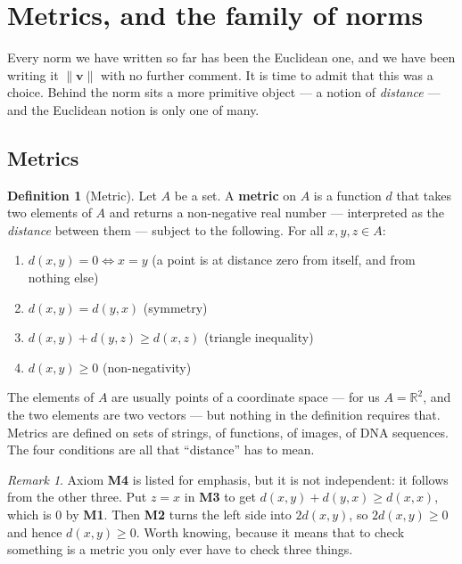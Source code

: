 \documentclass[11pt]{article}
\theoremstyle{definition}
\newtheorem{defn}{Definition}[section]
\theoremstyle{remark}
\newtheorem*{rmk}{Remark}
\newcommand{\R}{\mathbb{R}}
\newcommand{\vc}[1]{\mathbf{#1}}
\newcommand{\norm}[1]{\lVert #1\rVert}
\begin{document}
\section{Metrics, and the family of norms}
Every norm we have written so far has been the Euclidean one, and we have been
writing it $\norm{\vc{v}}$ with no further comment. It is time to admit that
this was a choice. Behind the norm sits a more primitive object --- a notion of
\emph{distance} --- and the Euclidean notion is only one of many.

\subsection{Metrics}
\begin{defn}[Metric]
Let $A$ be a set. A \textbf{metric} on $A$ is a function $d$ that takes two
elements of $A$ and returns a non-negative real number --- interpreted as the
\emph{distance} between them --- subject to the following. For all
$x,y,z\in A$:
\begin{enumerate}[label=\textbf{M\arabic*.},leftmargin=3.0em,itemsep=4pt,
                  topsep=4pt]
  \item $d(x,y)=0 \iff x=y$
        \hfill (a point is at distance zero from itself, and from nothing else)
  \item $d(x,y)=d(y,x)$
        \hfill (symmetry)
  \item $d(x,y)+d(y,z)\ge d(x,z)$
        \hfill (triangle inequality)
  \item $d(x,y)\ge 0$
        \hfill (non-negativity)
\end{enumerate}
\end{defn}

\noindent The elements of $A$ are usually points of a coordinate space --- for
us $A=\R^{2}$, and the two elements are two vectors --- but nothing in the
definition requires that. Metrics are defined on sets of strings, of functions,
of images, of DNA sequences. The four conditions are all that ``distance'' has
to mean.

\begin{rmk}
Axiom \textbf{M4} is listed for emphasis, but it is not independent: it follows
from the other three. Put $z=x$ in \textbf{M3} to get
$d(x,y)+d(y,x)\ge d(x,x)$, which is $0$ by \textbf{M1}. Then \textbf{M2} turns
the left side into $2d(x,y)$, so $2d(x,y)\ge 0$ and hence $d(x,y)\ge 0$. Worth
knowing, because it means that to check something is a metric you only ever have
to check three things.
\end{rmk}
\end{document}
